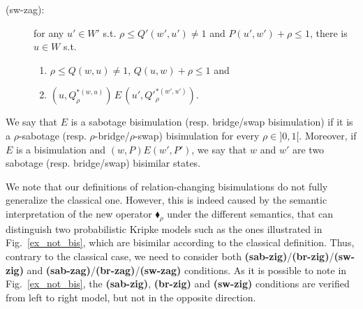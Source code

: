 \begin{definition}[Bisimulation]
\begin{description}
    \item[(sw-zag):]  for any $u'\in W'$ s.t. $\rho\le Q'(w',u')\neq 1$ and $P(u',w')+\rho\le 1$, there is $u\in W$ s.t. 
        \begin{enumerate}
            \item $\rho\le Q(w,u)\neq 1$, $Q(u,w)+\rho\le 1$ and
            \item $(u,Q_\rho^{*(w,u)})\,E\,(u',Q'^{*(w',u')}_\rho)$.
        \end{enumerate}
    
\end{description}



We say that $E$ is a sabotage bisimulation (resp. bridge/swap bisimulation) if it is a $\rho$-sabotage  (resp. $\rho$-bridge/$\rho$-swap) bisimulation for every $\rho\in]0,1[$. Moreover, if $E$ is a bisimulation and $(w,P) E  (w',P')$, we say that $w$ and $w'$ are two sabotage (resp. bridge/swap) bisimilar states.
\end{definition}

We note that our definitions of relation-changing bisimulations do not fully generalize the classical one. However, this is indeed caused by the semantic interpretation of the new operator $\blacklozenge_\rho$ under the different semantics, that can distinguish two probabilistic Kripke models such as the ones illustrated in Fig.~\ref{ex_not_bis}, which are bisimilar according to the classical definition. Thus, contrary to the classical case, we need to consider both \textbf{(sab-zig)}/\textbf{(br-zig)}/\textbf{(sw-zig)} and \textbf{(sab-zag)}/\textbf{(br-zag)}/\textbf{(sw-zag)}  conditions. As it is possible to note in Fig.~\ref{ex_not_bis}, the \textbf{(sab-zig)},  \textbf{(br-zig)} and \textbf{(sw-zig)} conditions are verified from left to right model, but not in the opposite direction.

